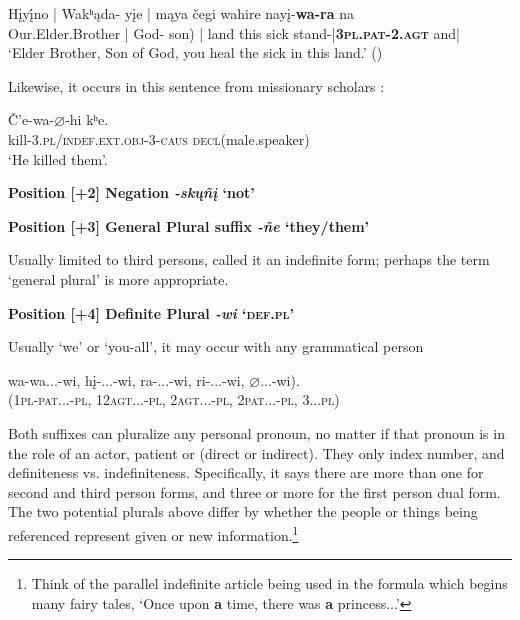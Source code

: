 \documentclass[output=paper]{LSP/langsci}
\begin{document}
\begin{exe}
\ex \gll H\k{i}y\k{\'i}no | Wakʰ\k{a}da- y\k{i}e   | m\k{a}ya  \v{c}egi  wahire nay\k{i}-\textbf{wa-ra} na \\
Our.Elder.Brother | God- son)    | land   this   sick      stand-|\textbf{\textsc{3pl.pat-2.agt}} and|\\
\trans `Elder Brother, Son of God, you heal the sick in this land.' (\citealt{Davidson1997})
 \end{exe}

Likewise, it occurs in this sentence from missionary scholars \citet[43: \#53]{HamiltonIrvin1848}:
\begin{exe}
\ex \gll \v{C}'e-wa-{\ob}$\varnothing${\cb}-hi       kʰe. \\
   	kill-3.\textsc{pl/indef.ext.obj}-3-\textsc{caus} \textsc{decl}(male.speaker)  \\
\trans `He killed them'.	
\end{exe}

\textbf{Position [+2]  Negation  \textit{-sk\k{u}ñ\k{i}}  `not' }	
\vspace{1em}
	   	      						     
\textbf{Position [+3]  General Plural suffix  \textit{-ñe}  `they/them'} 

Usually limited to third persons, \citet{Whitman1947} called it an indefinite form; perhaps the term `general plural' is more appropriate.  

\vspace{1em}
\textbf{Position [+4] Definite Plural \textit{-wi}  `\textsc{def.pl}'}

 Usually `we' or `you-all', it may occur with any grammatical person  
 \begin{exe} 
 \ex \gll wa-wa...-wi, { }  h\k{i}-...-wi, { }     ra-...-wi, { } ri-...-wi, { } $\varnothing$...-wi).  \\
            (1\textsc{pl}-\textsc{pat}...-\textsc{pl}, { } 12\textsc{agt}...-\textsc{pl}, { }    2\textsc{agt}...-\textsc{pl}, { } 2\textsc{pat}...-\textsc{pl}, { } 3...\textsc{pl})  \\
\end{exe}            

Both suffixes can pluralize any personal pronoun, no matter if that pronoun is in the role of an actor, patient or  (direct or indirect).  They only index number, and definiteness vs. indefiniteness.  Specifically, it says there are more than one for second and third person forms, and three or more for the first person dual form. The two potential plurals above differ by whether the people or things being referenced represent given or new information.\footnote{Think of the parallel indefinite article being used in the formula which begins many  fairy tales, `Once upon \textbf{a} time, there was \textbf{a} princess...'}   
\end{document}
